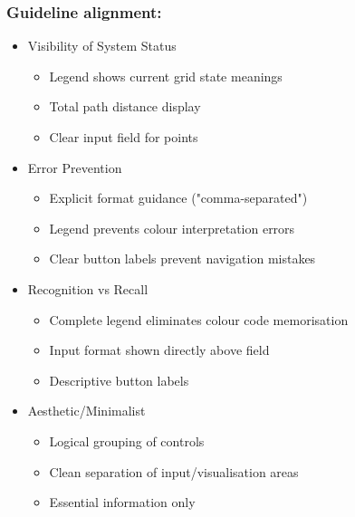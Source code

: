 \newpage




\subsubsection{Guideline alignment:}

    \begin{itemize}
        \item Visibility of System Status
        \begin{itemize}
            \item Legend shows current grid state meanings
            \item Total path distance display
            \item Clear input field for points
    
        \end{itemize}
    \end{itemize}
    
    \begin{itemize}
        \item Error Prevention
        \begin{itemize}
            \item Explicit format guidance ("comma-separated")
            \item Legend prevents colour interpretation errors
            \item Clear button labels prevent navigation mistakes
        \end{itemize}
    \end{itemize}
    
    \begin{itemize}
        \item Recognition vs Recall
    
        \begin{itemize}
            \item Complete legend eliminates colour code memorisation
            \item Input format shown directly above field
            \item Descriptive button labels
        \end{itemize}
    \end{itemize}
    
    
    \begin{itemize}
        \item Aesthetic/Minimalist
    
        \begin{itemize}
            \item Logical grouping of controls
            \item Clean separation of input/visualisation areas
            \item Essential information only
        \end{itemize}
\end{itemize}


